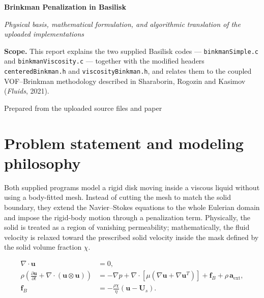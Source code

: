 \documentclass[11pt,a4paper]{article}
\begin{document}
\begin{center}
  {\fontsize{22}{26}\selectfont\bfseries\color{accent} Brinkman Penalization in Basilisk\par}
  \vspace{0.5em}
  {\large\itshape Physical basis, mathematical formulation, and algorithmic translation of the uploaded implementations\par}
\end{center}

\vspace{1em}

\begin{tcolorbox}[colback=white,colframe=lightblue,boxrule=0.6pt,left=6pt,right=6pt,top=6pt,bottom=6pt]
\textbf{Scope.} This report explains the two supplied Basilisk codes --- \texttt{binkmanSimple.c} and \texttt{binkmanViscosity.c} --- together with the modified headers \texttt{centeredBinkman.h} and \texttt{viscosityBinkman.h}, and relates them to the coupled VOF--Brinkman methodology described in Sharaborin, Rogozin and Kasimov (\emph{Fluids}, 2021).
\end{tcolorbox}

\begin{center}
  \small\color{gray} Prepared from the uploaded source files and paper
\end{center}

\section{Problem statement and modeling philosophy}

Both supplied programs model a rigid disk moving inside a viscous liquid without using a body-fitted mesh. Instead of cutting the mesh to match the solid boundary, they extend the Navier--Stokes equations to the whole Eulerian domain and impose the rigid-body motion through a penalization term. Physically, the solid is treated as a region of vanishing permeability; mathematically, the fluid velocity is relaxed toward the prescribed solid velocity inside the mask defined by the solid volume fraction $\chi$.

\begin{align}
\nabla\cdot \bm{u} &= 0, \\
\rho\left(\frac{\partial \bm{u}}{\partial t} + \nabla\cdot(\bm{u}\otimes \bm{u})\right) &= -\nabla p + \nabla\cdot\left[\mu\left(\nabla \bm{u} + \nabla \bm{u}^{T}\right)\right] + \bm{f}_B + \rho\,\bm{a}_{\mathrm{ext}}, \\
\bm{f}_B &= -\frac{\rho\chi}{\eta}(\bm{u} - \bm{U}_s).
\end{align}
\end{document}
